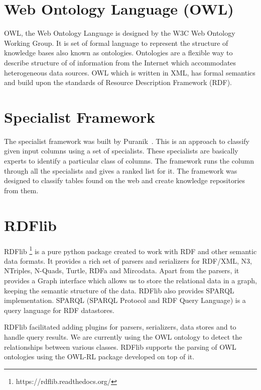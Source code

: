\section{Web Ontology Language (OWL)}

OWL, the Web Ontology Language is designed by the W3C Web Ontology Working Group. It is set of formal language to represent the structure of knowledge bases also known as ontologies. Ontologies are a flexible way to describe structure of of information from the Internet which accommodates heterogeneous data sources. OWL which is written in XML, has formal semantics and build upon the standards of Resource Description Framework (RDF).

\section{Specialist Framework}

The specialist framework was built by Puranik~\cite{puranik2012specialist}. This is an approach to classify given input columns using a set of specialists. These specialists are basically experts to identify a particular class of columns. The framework runs the column through all the specialists and gives a ranked list for it. The framework was designed to classify tables found on the web and create knowledge repositories from them.

\section{RDFlib}

RDFlib \footnote{https://rdflib.readthedocs.org/} is a pure python package created to work with RDF and other semantic data formats. It provides a rich set of parsers and serializers for RDF/XML, N3, NTriples, N-Quads, Turtle, RDFa and Mircodata. Apart from the parsers, it provides a Graph interface which allows us to store the relational data in a graph, keeping the semantic structure of the data. RDFlib also provides SPARQL implementation. SPARQL (SPARQL Protocol and RDF Query Language) is a query language for RDF datastores. 

RDFlib facilitated adding plugins for parsers, serializers, data stores and to handle query results. We are currently using the OWL ontology to detect the relationships between various classes. RDFlib supports the parsing of OWL ontologies using the OWL-RL package developed on top of it.
